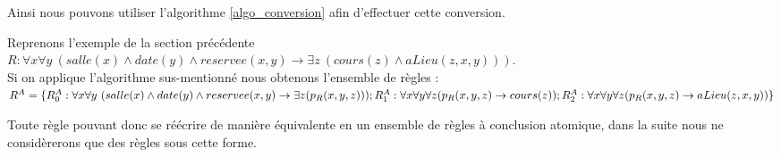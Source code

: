 Ainsi nous pouvons utiliser l'algorithme \ref{algo_conversion} afin d'effectuer cette
conversion.


Reprenons l'exemple de la section précédente\\ 
$R : \forall x \forall y\ (salle(x) \wedge date(y) \wedge reservee(x,y) 
\rightarrow \exists z\ (cours(z) \wedge aLieu(z,x,y)))$.\\
Si on applique l'algorithme sus-mentionné nous obtenons l'ensemble de règles : $R^A =\\ \{
	R^A_0 : \forall x \forall y\ (salle(x) \wedge date(y) \wedge reservee(x,y)
	\rightarrow \exists z (p_R(x,y,z))) ;\\
	R^A_1 : \forall x \forall y \forall z (p_R(x,y,z) \rightarrow cours(z)) ;\\
	R^A_2 : \forall x \forall y \forall z (p_R(x,y,z) \rightarrow aLieu(z,x,y))
\}$

Toute règle pouvant donc se réécrire de manière 
équivalente en un ensemble de
règles à conclusion atomique, dans la suite nous ne considèrerons que des règles sous cette 
forme.




